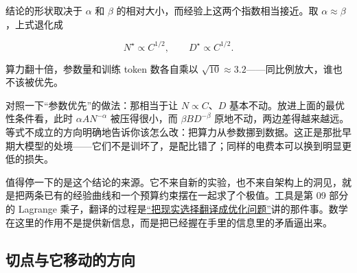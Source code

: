 结论的形状取决于 \(\alpha\) 和 \(\beta\) 的相对大小，而经验上这两个指数相当接近。取 \(\alpha \approx \beta\)，上式退化成

\[
  N^\star \propto C^{1/2}, \qquad D^\star \propto C^{1/2}.
\]

算力翻十倍，参数量和训练 token 数各自乘以 \(\sqrt{10} \approx 3.2\)——同比例放大，谁也不该被优先。

对照一下``参数优先''的做法：那相当于让 \(N \propto C\)、\(D\) 基本不动。放进上面的最优性条件看，此时 \(\alpha A N^{-\alpha}\) 被压得很小，而 \(\beta B D^{-\beta}\) 原地不动，两边差得越来越远。等式不成立的方向明确地告诉你该怎么改：把算力从参数挪到数据。这正是那批早期大模型的处境——它们不是训坏了，是配比错了；同样的电费本可以换到明显更低的损失。

值得停一下的是这个结论的来源。它不来自新的实验，也不来自架构上的洞见，就是把两条已有的经验曲线和一个预算约束摆在一起求了个极值。工具是第 09 部分的 Lagrange 乘子，翻译的过程是\hyperref[sec:09-Convex-Optimization/01-Optimization-Foundations/01]{``把现实选择翻译成优化问题''}讲的那件事。数学在这里的作用不是提供新信息，而是把已经握在手里的信息里的矛盾逼出来。

\subsection{切点与它移动的方向}

